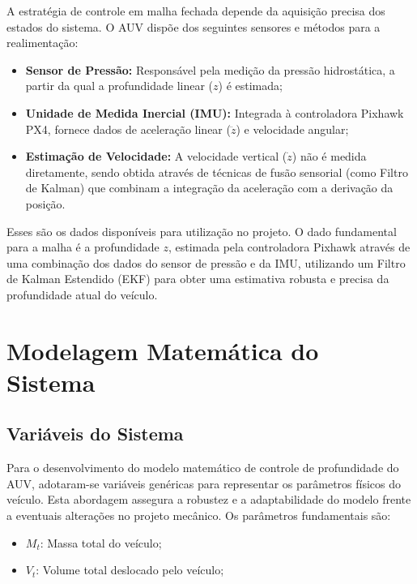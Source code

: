 \documentclass[12pt, a4paper]{article}
\newcommand{\vehicleMass}{M_t}
\newcommand{\vehicleVolume}{V_t}
\begin{document}
			A estratégia de controle em malha fechada depende da aquisição precisa dos estados do sistema. O AUV dispõe dos seguintes sensores e métodos para a realimentação:

			\begin{itemize}
				\item \textbf{Sensor de Pressão:} Responsável pela medição da pressão hidrostática, a partir da qual a profundidade linear ($z$) é estimada;

				\item \textbf{Unidade de Medida Inercial (IMU):} Integrada à controladora Pixhawk PX4, fornece dados de aceleração linear ($\ddot{z}$) e velocidade angular;

				\item \textbf{Estimação de Velocidade:} A velocidade vertical ($\dot{z}$) não é medida diretamente, sendo obtida através de técnicas de fusão sensorial (como Filtro de Kalman) que combinam a integração da aceleração com a derivação da posição.
			\end{itemize}

			Esses são os dados disponíveis para utilização no projeto. O dado fundamental para a malha é a profundidade $z$, estimada pela controladora Pixhawk através de uma combinação dos dados do sensor de pressão e da IMU, utilizando um Filtro de Kalman Estendido (EKF) para obter uma estimativa robusta e precisa da profundidade atual do veículo.

	\section{Modelagem Matemática do Sistema}

		\subsection{Variáveis do Sistema}

			Para o desenvolvimento do modelo matemático de controle de profundidade do AUV, adotaram-se variáveis genéricas para representar os parâmetros físicos do veículo. Esta abordagem assegura a robustez e a adaptabilidade do modelo frente a eventuais alterações no projeto mecânico. Os parâmetros fundamentais são:

			\begin{itemize}
				\item $\vehicleMass$: Massa total do veículo;
				\item $\vehicleVolume$: Volume total deslocado pelo veículo;
			\end{itemize}
\end{document}
